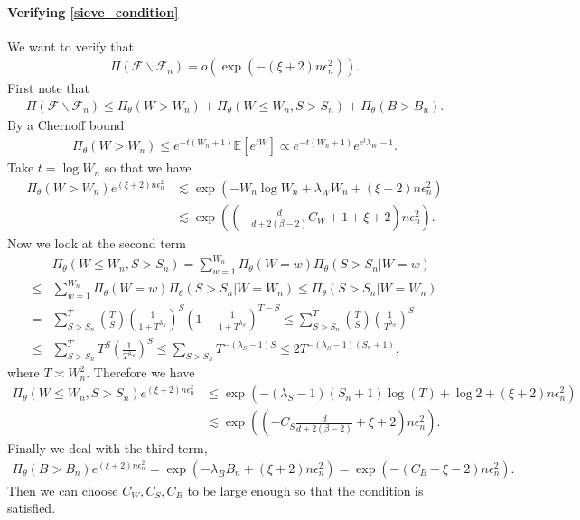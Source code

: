 \documentclass{article}
\newcommand{\E}{\mathbb{E}}
\newcommand{\F}{\mathcal{F}}
\theoremstyle{plain}
\theoremstyle{definition}
\theoremstyle{remark}
\begin{document}
\paragraph{Verifying \eqref{sieve_condition}} We want to verify that 
 \begin{align*}
         \Pi(\F \backslash \F_n) = o(\exp(-(\xi+2)n \epsilon_n^2)). 
     \end{align*}
First note that
\begin{align*}
    \Pi(\F \backslash \F_n) \leq \Pi_\theta(W > W_n) + \Pi_\theta(W \leq W_{n}, S > S_n) + \Pi_\theta(B > B_n). 
\end{align*}
By a Chernoff bound 
\begin{align*}
    \Pi_\theta (W > W_{n}) \leq e^{-t (W_{n} + 1)} \E[e^{t W}] \propto e^{-t (W_{n} + 1)} e^{e^t \lambda_W - 1}. 
\end{align*}
Take $t =\log W_{n}$ so that we have
\begin{align*}
    \Pi_\theta(W > W_{n}) e^{(\xi+2) n\epsilon_{n}^2 }&\lesssim \exp\left(- W_{n} \log W_{n} + \lambda_W W_{n} + (\xi+2) n\epsilon_{n}^2\right) \\ & \lesssim \exp ( (- \frac{d}{d + 2(\beta-2)}C_{W} + 1 + \xi + 2) n \epsilon_{n}^2). 
\end{align*}
Now we look at the second term
\begin{align*}
    & \Pi_\theta(W \leq W_{n}, S > S_{n}) = \sum_{w= 1}^{W_{n}} \Pi_\theta(W = w) \Pi_\theta (S > S_{n} | W=w) \\
    \leq & \sum_{w=1}^{W_{n}} \Pi_\theta(W = w) \Pi_\theta (S > S_{n} | W = W_n) \leq \Pi_\theta (S > S_{n} | W = W_{n}) \\
    = & \sum_{S>S_{n}}^T \binom{T}{S}
    \left(\frac{1}{1 + T^{\lambda_S}}\right)^S
    \left(1-\frac{1}{1 + T^{\lambda_S}}\right)^{T-S} \leq \sum_{S>S_{n}}^T \binom{T}{S} \left(\frac{1}{T^{\lambda_S}}\right)^S  \\
    \leq & \sum_{S> S_{n}}^T T^S \left(\frac{1}{T^{\lambda_S}}\right)^S \leq \sum_{S > S_{n}} T^{-(\lambda_S - 1)S } \leq 2T^{-(\lambda_S - 1)(S_{n} + 1)},
\end{align*}
where $T \asymp W_n^2$.
Therefore we have
\begin{align*}
    \Pi_\theta(W \leq W_{n}, S > S_{n}) e^{(\xi+2) n \epsilon_{n}^2} & \leq \exp(- (\lambda_S -1) (S_{n}+1) \log (T) + \log 2 + (\xi+2) n\epsilon_{n}^2) \\ & \lesssim \exp((- C_{S} \frac{d}{d + 2(\beta-2)} + \xi + 2) n \epsilon_{n}^2).
\end{align*}
Finally we deal with the third term,
\begin{align*}
    \Pi_\theta(B > B_{n}) e^{(\xi+2) n \epsilon_{n}^2} = \exp \left( -\lambda_B B_{n}  + (\xi + 2) n \epsilon_{n}^2 \right) = \exp(-( C_{B} - \xi - 2) n \epsilon_{n}^2).
\end{align*}
Then we can choose $C_{W}, C_{S}, C_{B}$ to be large enough so that the condition is satisfied.
\end{document}
